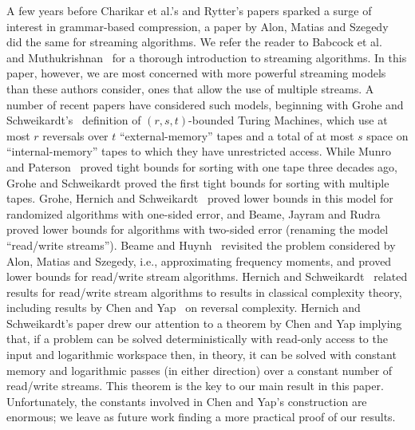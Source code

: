 \documentclass[runningheads]{llncs}
\begin{document}
A few years before Charikar et al.'s and Rytter's papers sparked a surge of interest in grammar-based compression, a paper by Alon, Matias and Szegedy~\cite{AMS99} did the same for streaming algorithms.  We refer the reader to Babcock et al.~\cite{BBDMW02} and Muthukrishnan~\cite{Mut05} for a thorough introduction to streaming algorithms.  In this paper, however, we are most concerned with more powerful streaming models than these authors consider, ones that allow the use of multiple streams.  A number of recent papers have considered such models, beginning with Grohe and Schweikardt's~\cite{GS05} definition of \((r, s, t)\)-bounded Turing Machines, which use at most $r$ reversals over $t$ ``external-memory'' tapes and a total of at most $s$ space on ``internal-memory'' tapes to which they have unrestricted access.  While Munro and Paterson~\cite{MP80} proved tight bounds for sorting with one tape three decades ago, Grohe and Schweikardt proved the first tight bounds for sorting with multiple tapes.  Grohe, Hernich and Schweikardt~\cite{GHS09} proved lower bounds in this model for randomized algorithms with one-sided error, and Beame, Jayram and Rudra~\cite{BJR07} proved lower bounds for algorithms with two-sided error (renaming the model ``read/write streams'').  Beame and Huynh~\cite{BH08} revisited the problem considered by Alon, Matias and Szegedy, i.e., approximating frequency moments, and proved lower bounds for read/write stream algorithms.  Hernich and Schweikardt~\cite{HS08} related results for read/write stream algorithms to results in classical complexity theory, including results by Chen and Yap~\cite{CY91} on reversal complexity.  Hernich and Schweikardt's paper drew our attention to a theorem by Chen and Yap implying that, if a problem can be solved deterministically with read-only access to the input and logarithmic workspace then, in theory, it can be solved with constant memory and logarithmic passes (in either direction) over a constant number of read/write streams.  This theorem is the key to our main result in this paper.  Unfortunately, the constants involved in Chen and Yap's construction are enormous; we leave as future work finding a more practical proof of our results.
\end{document}
